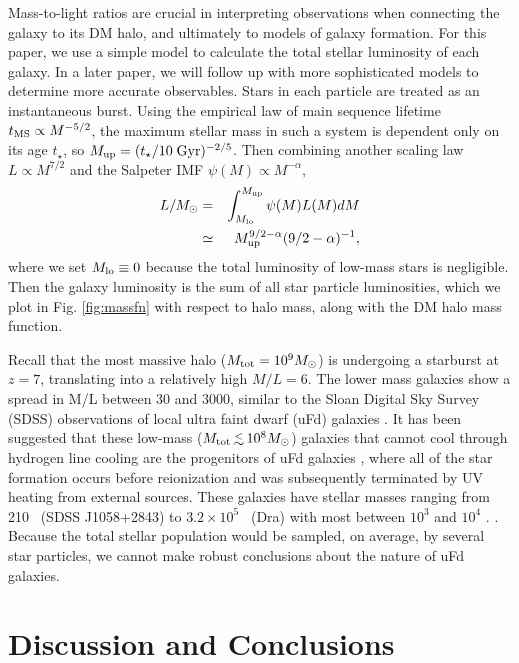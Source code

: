 \documentclass[12pt,preprint]{aastex}
\begin{document}
Mass-to-light ratios are crucial in interpreting observations when
connecting the galaxy to its DM halo, and ultimately to models of
galaxy formation.  For this paper, we use a simple model to calculate
the total stellar luminosity of each galaxy.  In a later paper, we
will follow up with more sophisticated models to determine more
accurate observables.  Stars in each particle are treated as an
instantaneous burst.  Using the empirical law of main sequence
lifetime $t_{\rm MS} \propto M^{-5/2}$, the maximum stellar mass in
such a system is dependent only on its age $t_\star$, so $M_{\rm up} =
(t_\star / 10\;\mathrm{Gyr})^{-2/5}$.  Then combining another scaling
law $L \propto M^{7/2}$ and the Salpeter IMF $\psi(M) \propto
M^{-\alpha}$,
%
\begin{eqnarray}
  \label{eqn:lum}
  L/M_\odot &=& \int_{M_{\rm lo}}^{M_{\rm up}} \psi(M) L(M) dM
  \nonumber\\ &\simeq& M_{\rm up}^{9/2-\alpha} (9/2 - \alpha)^{-1},
\end{eqnarray}
where we set $M_{\rm lo} \equiv 0$ because the total luminosity of
low-mass stars is negligible.  Then the galaxy luminosity is the sum
of all star particle luminosities, which we plot in
Fig. \ref{fig:massfn} with respect to halo mass, along with the DM
halo mass function.

Recall that the most massive halo ($M_{\rm tot} = 10^9 \Ms$) is
undergoing a starburst at $z=7$, translating into a relatively high
$M/L = 6$.  The lower mass galaxies show a spread in M/L between 30
and 3000, similar to the Sloan Digital Sky Survey (SDSS) observations
of local ultra faint dwarf (uFd) galaxies \citep[e.g.][]{Strigari08}.
It has been suggested that these low-mass ($M_{\rm tot} \lsim 10^8
\Ms$) galaxies that cannot cool through hydrogen line cooling are the
progenitors of uFd galaxies \citep{Bovill11a, Bovill11b}, where all of
the star formation occurs before reionization and was subsequently
terminated by UV heating from external sources.  These galaxies have
stellar masses ranging from 210 \Ms~(SDSS J1058+2843) to $3.2 \times
10^5$ \Ms~(Dra) with most between $10^3$ and $10^4$
\Ms. \citep{Martin08_uFd}.  Because the total stellar population would
be sampled, on average, by several star particles, we cannot make
robust conclusions about the nature of uFd galaxies.

\section{Discussion and Conclusions}
\label{sec:discuss}
\end{document}
